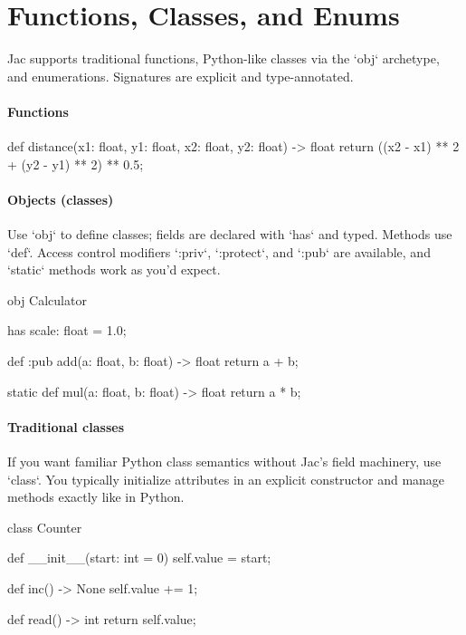 \section{Functions, Classes, and Enums}

Jac supports traditional functions, Python-like classes via the `obj` archetype, and enumerations. Signatures are explicit and type-annotated.

\paragraph{Functions}

\begin{jacblock}
def distance(x1: float, y1: float, x2: float, y2: float) -> float {
    return ((x2 - x1) ** 2 + (y2 - y1) ** 2) ** 0.5;
}
\end{jacblock}

\paragraph{Objects (classes)}

Use `obj` to define classes; fields are declared with `has` and typed. Methods use `def`. Access control modifiers `:priv`, `:protect`, and `:pub` are available, and `static` methods work as you'd expect.

\begin{jacblock}
obj Calculator {
    has scale: float = 1.0;

    def :pub add(a: float, b: float) -> float {
        return a + b;
    }

    static def mul(a: float, b: float) -> float {
        return a * b;
    }
}
\end{jacblock}

\paragraph{Traditional classes}

If you want familiar Python class semantics without Jac's field machinery, use `class`. You typically initialize attributes in an explicit constructor and manage methods exactly like in Python.

\begin{jacblock}
class Counter {
    def __init__(start: int = 0) {
        self.value = start;
    }

    def inc() -> None { self.value += 1; }

    def read() -> int { return self.value; }
}
\end{jacblock}

